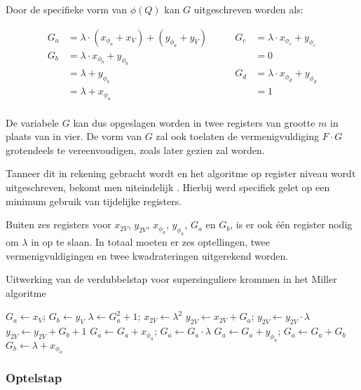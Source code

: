 Door de specifieke vorm van $\phi(Q)$ kan $G$ uitgeschreven worden als:

\[\begin{aligned}
	G_a	&=	\lambda \cdot (x_{\phi_a} + x_V) + (y_{\phi_a} + y_V)\qquad&
				G_c	&= \lambda \cdot x_{\phi_c} + y_{\phi_c}\\
	G_b	&=	\lambda \cdot x_{\phi_b} + y_{\phi_b}&
						&= 0\\
			&= \lambda + y_{\phi_b}&
				G_d	&= \lambda \cdot x_{\phi_d} + y_{\phi_d}\\
			&=	\lambda + x_{\phi_a}&
						&= 1\\
\end{aligned}\]

De variabele $G$ kan dus opgeslagen worden in twee registers van grootte $m$ in plaats van in vier. De vorm van $G$ zal ook toelaten de vermenigvuldiging $F \cdot G$ grotendeels te vereenvoudigen, zoals later gezien zal worden.

Tanneer dit in rekening gebracht wordt en het algoritme op register niveau wordt uitgeschreven, bekomt men uiteindelijk . Hierbij werd specifiek gelet op een minimum gebruik van tijdelijke registers.

Buiten zes registers voor $x_{2V}$, $y_{2V}$, $x_{\phi_a}$, $y_{\phi_a}$, $G_a$ en $G_b$, is er ook \'e\'en register nodig om $\lambda$ in op te slaan. In totaal moeten er zes optellingen, twee vermenigvuldigingen en twee kwadrateringen uitgerekend worden.

\begin{algorithm}[h]
	\caption{Uitwerking van de verdubbelstap voor supersinguliere krommen in het Miller algoritme}
	\label{algoritme-implementatie-miller-double-detail}
	$G_a \leftarrow x_V$; $G_b \leftarrow y_V$\;
	$\lambda \leftarrow G_a^2 + 1$; $x_{2V} \leftarrow \lambda ^2$\;
	$y_{2V} \leftarrow x_{2V} + G_a$; $y_{2V} \leftarrow y_{2V} \cdot \lambda$\;
	$y_{2V} \leftarrow y_{2V} + G_b + 1$\;
	$G_a \leftarrow G_a + x_{\phi_a}$; $G_a \leftarrow G_a \cdot \lambda$\;
	$G_a \leftarrow G_a + y_{\phi_a}$; $G_a \leftarrow G_a + G_b$\;
	$G_b \leftarrow \lambda + x_{\phi_a}$\;
\end{algorithm}

\subsubsection{Optelstap}

